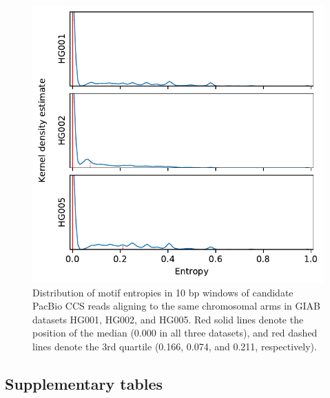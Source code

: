 \documentclass{article}
\begin{document}
\begin{figure}[ht!] \centering
\includegraphics[height=.95\textheight,width=.65\textwidth,keepaspectratio]{figures/entropy.pdf}
\caption{
    Distribution of motif entropies in 10 bp windows of candidate PacBio CCS reads aligning to the same chromosomal arms in GIAB datasets HG001, HG002, and HG005.
    Red solid lines denote the position of the median (0.000 in all three datasets), and red dashed lines denote the 3rd quartile (0.166, 0.074, and 0.211, respectively).
}
\label{fig:entropy}
\end{figure}
\clearpage \pagebreak

\subsection*{Supplementary tables} 



\end{document}
